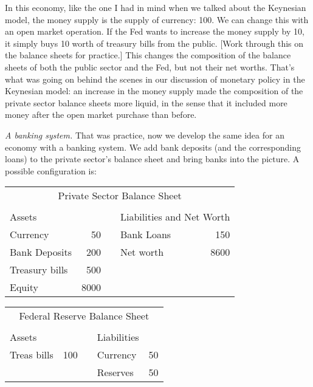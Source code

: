 \documentclass[letterpaper,12pt]{article}
\begin{document}
     In this economy, like the one I had in mind when we talked about the
Keynesian model, the money supply is the supply of currency:  100.  We can change this with an
open market operation.  If the Fed wants to increase the money supply by 10, it simply buys 10
worth of treasury bills from the public.  [Work through this on the balance sheets for practice.]
This changes the composition of the balance sheets of both the public sector and the Fed, but not
their net worths.  That's what was going on behind the scenes in our discussion of monetary policy
in the Keynesian model:  an increase in the money supply made the composition of the private
sector balance sheets more liquid, in the sense that it included more money after the open market
purchase than before.

     {\em A banking system.}
That was practice, now we develop the same idea for an economy with a banking system.  We add bank
deposits (and the corresponding loans) to the private sector's balance sheet and bring banks into
the picture.  A possible configuration is:
%
\begin{center}
\begin{tabular}{lrclr}
\multicolumn{5}{c}{Private Sector Balance Sheet}                             \\
                                                                &       \\
            Assets                &&&
                        \multicolumn{2}{l}{Liabilities and Net Worth}   \\
            Currency        &    50   &&   Bank Loans &    150          \\
            Bank Deposits   &   200   &&   Net worth  &   8600          \\
            Treasury bills  &   500   &&                                \\
            Equity          &  8000   &&                                \\
\end{tabular}
\end{center}
%
\begin{center}
\begin{tabular}{lrclr}
\multicolumn{5}{c}{Federal Reserve Balance Sheet}               \\
                                                        &       \\
                    Assets      &&&          Liabilities        \\
                    Treas bills & 100    &&  Currency   & 50    \\
                                &        &&  Reserves   & 50    \\
\end{tabular}
\end{center}
\end{document}
